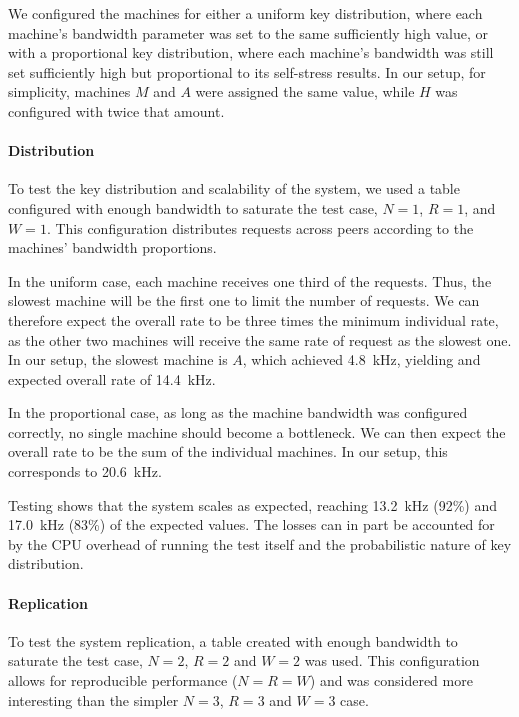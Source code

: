 We configured the machines for either a uniform key distribution, where each machine's bandwidth parameter was set to the same sufficiently high value,
or with a proportional key distribution, where each machine's bandwidth was still set sufficiently high but proportional to its self-stress results.
In our setup, for simplicity, machines $M$ and $A$ were assigned the same value, while $H$ was configured with twice that amount.

\paragraph{Distribution}
To test the key distribution and scalability of the system, we used a table configured
with enough bandwidth to saturate the test case, $N=1$, $R=1$, and $W=1$.
This configuration distributes requests across peers according to the machines' bandwidth proportions.


In the uniform case, each machine receives one third of the requests.
Thus, the slowest machine will be the first one to limit the number of requests.
We can therefore expect the overall rate to be three times the minimum individual rate,
as the other two machines will receive the same rate of request as the slowest one.
In our setup, the slowest machine is $A$, which achieved \SI{4.8}{\kilo\hertz}, yielding and expected overall rate of \SI{14.4}{\kilo\hertz}.


In the proportional case, as long as the machine bandwidth was configured correctly, no single machine should become a bottleneck.
We can then expect the overall rate to be the sum of the individual machines.
In our setup, this corresponds to \SI{20.6}{\kilo\hertz}.


Testing shows that the system scales as expected, reaching \SI{13.2}{\kilo\hertz} (92\%) and \SI{17.0}{\kilo\hertz} (83\%) of the expected values.
The losses can in part be accounted for by the CPU overhead of running the test itself and the probabilistic nature of key distribution.



\paragraph{Replication}
To test the system replication, a table created with enough bandwidth to saturate the test case, $N=2$, $R=2$ and $W=2$ was used.
This configuration allows for reproducible performance ($N=R=W$) and was considered more interesting than the simpler $N=3$, $R=3$ and $W=3$ case.


